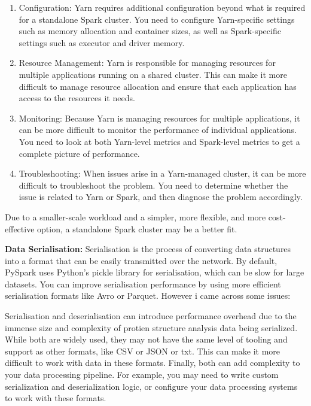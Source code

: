 \documentclass[]{final_report}
\begin{document}
\begin{enumerate}
    \item Configuration: Yarn requires additional configuration beyond what is required for a standalone Spark cluster. You need to configure Yarn-specific settings such as memory allocation and container sizes, as well as Spark-specific settings such as executor and driver memory.
    \item Resource Management: Yarn is responsible for managing resources for multiple applications running on a shared cluster. This can make it more difficult to manage resource allocation and ensure that each application has access to the resources it needs.
    \item Monitoring: Because Yarn is managing resources for multiple applications, it can be more difficult to monitor the performance of individual applications. You need to look at both Yarn-level metrics and Spark-level metrics to get a complete picture of performance.
    \item Troubleshooting: When issues arise in a Yarn-managed cluster, it can be more difficult to troubleshoot the problem. You need to determine whether the issue is related to Yarn or Spark, and then diagnose the problem accordingly.
\end{enumerate}

Due to a smaller-scale workload and a simpler, more flexible, and more cost-effective option, a standalone Spark cluster may be a better fit.

\textbf{Data Serialisation:} Serialisation is the process of converting data structures into a format that can be easily transmitted over the network. By default, PySpark uses Python's pickle library for serialisation, which can be slow for large datasets. You can improve serialisation performance by using more efficient serialisation formats like Avro or Parquet. However i came across some issues:

Serialisation and deserialisation can introduce performance overhead due to the immense size and complexity of protien structure analysis data being serialized. While both are widely used, they may not have the same level of tooling and support as other formats, like CSV or JSON or txt. This can make it more difficult to work with data in these formats. Finally, both can add complexity to your data processing pipeline. For example, you may need to write custom serialization and deserialization logic, or configure your data processing systems to work with these formats.
\end{document}
